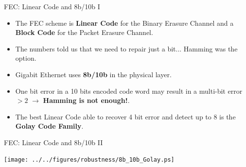 \documentclass[compress,red]{beamer}
\begin{document}
\begin{frame}{FEC: Linear Code and 8b/10b I}

  \begin{itemize}
    \item The FEC scheme is \textbf{Linear Code} for the Binary Erasure
    Channel and a \textbf{Block Code} for the Packet Erasure Channel. 
    \item The numbers told us that we need to repair just a bit... Hamming was the option.
    \item Gigabit Ethernet uses \textbf{8b/10b} in the physical layer. 
    \item One bit error in a 10 bits encoded code word may result in a multi-bit
    error $>2$ $\rightarrow$
    \textbf{Hamming is not enough!}.
    \item The best Linear Code able to recover 4 bit error and detect up to 8 is
    the \textbf{Golay Code Family}.
  \end{itemize}
\end{frame}

\begin{frame}{FEC: Linear Code and 8b/10b II}
 
 \begin{center}
 \texttt{[image: ../../figures/robustness/8b\_10b\_Golay.ps]}
 \end{center}

\end{frame}
\end{document}

